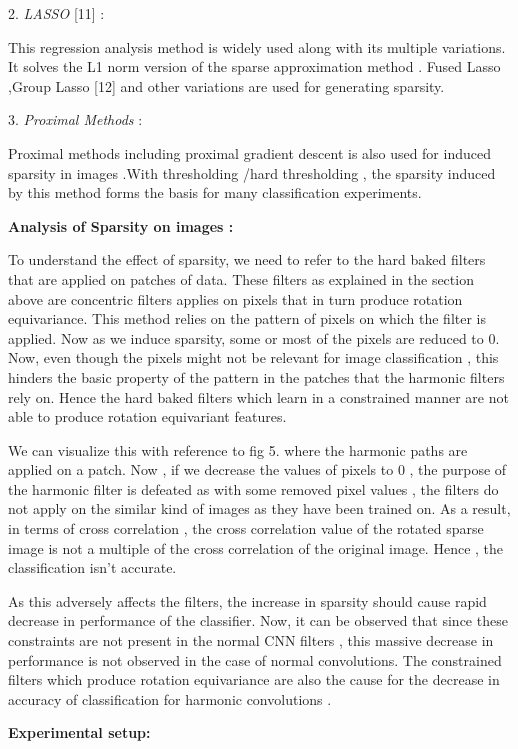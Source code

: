 \documentclass{article}
\begin{document}
2.	\emph{ LASSO } [11] :

This regression analysis method is widely used along with its multiple variations. It solves the L1 norm version of the sparse approximation method . Fused Lasso ,Group Lasso [12] and other variations are used for generating sparsity.

3.	\emph{Proximal Methods} :

Proximal methods including proximal gradient descent is also used for induced sparsity in images .With thresholding /hard thresholding , the sparsity induced by this method forms the basis for many classification experiments.

\textbf{Analysis of Sparsity on images :}

To understand the effect of sparsity, we need to refer to the hard baked filters that are applied on patches of data. These filters as explained in the section above are concentric filters applies on pixels that in turn produce rotation equivariance. This method relies on the pattern of pixels on which the filter is applied. Now as we induce sparsity, some or most of the pixels are reduced to 0. Now, even though the pixels might not be relevant for image classification , this hinders the basic property of the pattern in the patches that the harmonic filters rely on. Hence the hard baked filters which learn in a constrained manner are not able to produce rotation equivariant features. 

We can visualize this with reference to fig 5.  where the harmonic paths are applied on a patch. Now , if we decrease the values of pixels to 0 , the purpose of the harmonic filter is defeated as with some removed pixel values , the filters do not apply on the similar kind of images as they have been trained on. As a result, in terms of cross correlation , the cross correlation value of the rotated sparse image is not a multiple of the cross correlation of the original image. Hence , the classification isn’t accurate. 

As this adversely affects the filters, the increase in sparsity should cause rapid decrease in performance of the classifier. Now, it can be observed that since these constraints are not present in the normal CNN filters , this massive decrease in performance is not observed in the case of normal convolutions. The constrained filters which produce rotation equivariance are also the cause for the decrease in accuracy of classification for harmonic convolutions .

\textbf{Experimental setup:}
 
\end{document}

